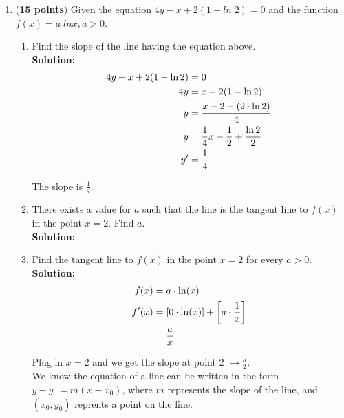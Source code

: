 \documentclass[a4paper]{article}
\begin{document}
\begin{enumerate}
\begin{enumerate}
	
	
\end{enumerate}


\item (\textbf{15 points}) Given the equation $4y - x + 2(1 - ln\; 2) = 0$ and the function $f(x) = a \; ln x, a > 0$.\\


\begin{enumerate}
	\item Find the slope of the line having the equation above.\\
	\textbf{Solution:}\\
	
\begin{align*}
	4y - x + 2(1 - \ln 2) &= 0\notag\\
	4y &= x - 2(1 - \ln 2)\notag\\
	y &= \frac{x - 2 - (2 \cdot \ln 2)}{4}\notag\\
	y &= \frac{1}{4}x - \frac{1}{2} + \frac{\ln 2}{2}\notag\\
	y' &= \frac{1}{4}\notag
\end{align*}	

The slope is $\frac{1}{4}$.\\	
	
	
	\item There exists a value for $a$ such that the line is the tangent line to $f(x)$ in the point $x = 2$. Find $a$.\\
	\textbf{Solution:}\\
	
		
	\item Find the tangent line to $f(x)$ in the point $x = 2$ for every $a > 0$.\\
	\textbf{Solution:}\\
	
	
	\begin{align*}
		f(x) &= a \cdot \ln(x)\notag\\
		f'(x) &= \left[ 0 \cdot \ln(x)\right] + \left[ a \cdot \frac{1}{x}\right]\notag\\
		&= \frac{a}{x}
	\end{align*}
	
Plug in $x = 2$ and we get the slope at point 2 $\rightarrow \frac{a}{2}$.\\	
	
We know the equation of a line can be written in the form $y - y_0 = m(x - x_0)$, where $m$ represents the slope of the line, and $(x_0,y_0)$ reprents a point on the line.


\end{enumerate}
\end{enumerate}
\end{document}
